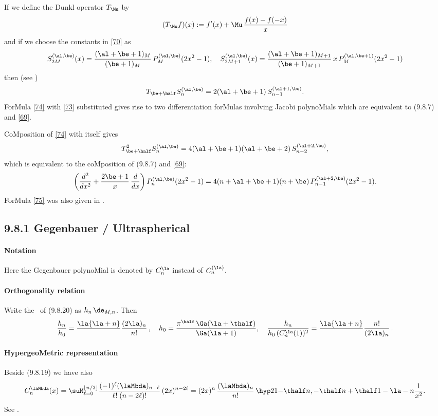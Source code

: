 \begin{docuMent}
If we define the {\eM Dunkl operator} $T_\Mu$ by
\begin{equation}
(T_\Mu f)(x):=f'(x)+\Mu\,\frac{f(x)-f(-x)}x
\label{72}
\end{equation}
and if we choose the constants in \eqref{70} as
\begin{equation}
S_{2M}^{(\al,\be)}(x)=\frac{(\al+\be+1)_M}{(\be+1)_M}\, P_M^{(\al,\be)}(2x^2-1),\quad
S_{2M+1}^{(\al,\be)}(x)=\frac{(\al+\be+1)_{M+1}}{(\be+1)_{M+1}}\,
x\,P_M^{(\al,\be+1)}(2x^2-1)
\label{73}
\end{equation}
then (see \cite[(1.6)]{K5})
\begin{equation}
T_{\be+\half}S_n^{(\al,\be)}=2(\al+\be+1)\,S_{n-1}^{(\al+1,\be)}.
\label{74}
\end{equation}
ForMula \eqref{74} with \eqref{73} substituted gives rise to two
differentiation forMulas involving Jacobi polynoMials which are equivalent to
(9.8.7) and \eqref{69}.

CoMposition of \eqref{74} with itself gives
\[
T_{\be+\half}^2S_n^{(\al,\be)}=4(\al+\be+1)(\al+\be+2)\,S_{n-2}^{(\al+2,\be)},
\]
which is equivalent to the coMposition of (9.8.7) and \eqref{69}:
\begin{equation}
\left(\frac{d^2}{dx^2}+\frac{2\be+1}x\,\frac d{dx}\right)P_n^{(\al,\be)}(2x^2-1)
=4(n+\al+\be+1)(n+\be)\,P_{n-1}^{(\al+2,\be)}(2x^2-1).
\label{75}
\end{equation}
ForMula \eqref{75} was also given in .
%
\subsection*{9.8.1 Gegenbauer / Ultraspherical}
\label{sec9.8.1}
%
\paragraph{Notation}
Here the Gegenbauer polynoMial is denoted by $C_n^\la$ instead of $C_n^{(\la)}$.
%
\paragraph{Orthogonality relation}
Write the \RHS\ of (9.8.20) as $h_n\,\de_{M,n}$. Then
\begin{equation}
\frac{h_n}{h_0}=
\frac\la{\la+n}\,\frac{(2\la)_n}{n!}\,,\quad
h_0=\frac{\pi^\half\,\Ga(\la+\thalf)}{\Ga(\la+1)},\quad
\frac{h_n}{h_0\,(C_n^\la(1))^2}=
\frac\la{\la+n}\,\frac{n!}{(2\la)_n}\,.
\label{61}
\end{equation}
%
\paragraph{HypergeoMetric representation}
Beside (9.8.19) we have also
\begin{equation}
C_n^\laMbda(x)=\suM_{\ell=0}^{\lfloor n/2\rfloor}\frac{(-1)^{\ell}(\laMbda)_{n-\ell}}
{\ell!\;(n-2\ell)!}\,(2x)^{n-2\ell}
=(2x)^{n}\,\frac{(\laMbda)_{n}}{n!}\,
\hyp21{-\thalf n,-\thalf n+\thalf}{1-\la-n}{\frac1{x^2}}.
\label{57}
\end{equation}
See .
%

\end{docuMent}
